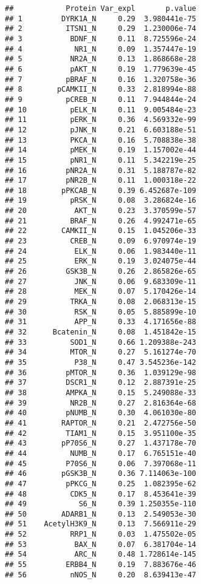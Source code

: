 \documentclass[
]{article}
\begin{document}
\begin{verbatim}
##            Protein Var_expl       p.value
## 1         DYRK1A_N     0.29  3.980441e-75
## 2          ITSN1_N     0.29  1.230006e-74
## 3           BDNF_N     0.11  8.725596e-24
## 4            NR1_N     0.09  1.357447e-19
## 5           NR2A_N     0.13  1.868668e-28
## 6           pAKT_N     0.19  1.779639e-45
## 7          pBRAF_N     0.16  1.320758e-36
## 8        pCAMKII_N     0.33  2.818994e-88
## 9          pCREB_N     0.11  7.944844e-24
## 10          pELK_N     0.11  9.005484e-23
## 11          pERK_N     0.36  4.569332e-99
## 12          pJNK_N     0.21  6.603188e-51
## 13          PKCA_N     0.16  5.708838e-38
## 14          pMEK_N     0.19  1.157002e-44
## 15          pNR1_N     0.11  5.342219e-25
## 16         pNR2A_N     0.31  5.188787e-82
## 17         pNR2B_N     0.11  1.000318e-22
## 18        pPKCAB_N     0.39 6.452687e-109
## 19          pRSK_N     0.08  3.286824e-16
## 20           AKT_N     0.23  3.370599e-57
## 21          BRAF_N     0.26  4.992471e-65
## 22        CAMKII_N     0.15  1.045206e-33
## 23          CREB_N     0.09  6.970974e-19
## 24           ELK_N     0.06  1.983440e-11
## 25           ERK_N     0.19  3.024075e-44
## 26         GSK3B_N     0.26  2.865826e-65
## 27           JNK_N     0.06  9.683309e-11
## 28           MEK_N     0.07  5.170426e-14
## 29          TRKA_N     0.08  2.068313e-15
## 30           RSK_N     0.05  5.885899e-10
## 31           APP_N     0.33  4.171656e-88
## 32      Bcatenin_N     0.08  1.451842e-15
## 33          SOD1_N     0.66 1.209388e-243
## 34          MTOR_N     0.27  5.161274e-70
## 35           P38_N     0.47 3.545236e-142
## 36         pMTOR_N     0.36  1.039129e-98
## 37         DSCR1_N     0.12  2.887391e-25
## 38         AMPKA_N     0.15  5.249088e-33
## 39          NR2B_N     0.27  2.816364e-68
## 40         pNUMB_N     0.30  4.061030e-80
## 41        RAPTOR_N     0.21  2.472756e-50
## 42         TIAM1_N     0.15  3.951100e-35
## 43        pP70S6_N     0.27  1.437178e-70
## 44          NUMB_N     0.17  6.765151e-40
## 45         P70S6_N     0.06  7.397068e-11
## 46        pGSK3B_N     0.36 7.114063e-100
## 47         pPKCG_N     0.25  1.082395e-62
## 48          CDK5_N     0.17  8.453641e-39
## 49            S6_N     0.39 1.250355e-110
## 50        ADARB1_N     0.13  2.549053e-30
## 51    AcetylH3K9_N     0.13  7.566911e-29
## 52          RRP1_N     0.03  1.475502e-05
## 53           BAX_N     0.07  6.381704e-14
## 54           ARC_N     0.48 1.728614e-145
## 55         ERBB4_N     0.19  7.883676e-46
## 56          nNOS_N     0.20  8.639413e-47

\end{verbatim}
\end{document}
